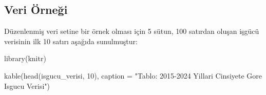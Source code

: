 \documentclass[
  11pt,
  a4paper,
  DIV=11,
  numbers=noendperiod]{scrartcl}
\newenvironment{Shaded}{\begin{snugshade}}{\end{snugshade}}
\newcommand{\AttributeTok}[1]{\textcolor[rgb]{0.40,0.45,0.13}{#1}}
\newcommand{\DecValTok}[1]{\textcolor[rgb]{0.68,0.00,0.00}{#1}}
\newcommand{\FunctionTok}[1]{\textcolor[rgb]{0.28,0.35,0.67}{#1}}
\newcommand{\NormalTok}[1]{\textcolor[rgb]{0.00,0.23,0.31}{#1}}
\newcommand{\StringTok}[1]{\textcolor[rgb]{0.13,0.47,0.30}{#1}}
\begin{document}
\subsection{Veri Örneği}\label{veri-uxf6rneux11fi}

Düzenlenmiş veri setine bir örnek olması için 5 sütun, 100 satırdan
oluşan işgücü verisinin ilk 10 satırı aşağıda sunulmuştur:

\begin{Shaded}
\begin{Highlighting}[]
\FunctionTok{library}\NormalTok{(knitr)}

\FunctionTok{kable}\NormalTok{(}\FunctionTok{head}\NormalTok{(isgucu\_verisi, }\DecValTok{10}\NormalTok{), }\AttributeTok{caption =} \StringTok{"Tablo: 2015{-}2024 Yillari Cinsiyete Gore Isgucu Verisi"}\NormalTok{)}
\end{Highlighting}
\end{Shaded}
\end{document}
